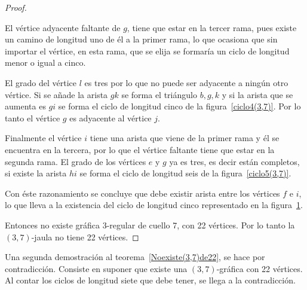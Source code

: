 \documentclass[12pt]{book}
\theoremstyle{definition}
\begin{document}
\begin{proof}
\begin{figure}
\caption{} \label{ciclo6(3,7)}
\end{figure}


El vértice adyacente faltante de $g$, tiene que estar en la tercer
rama, pues existe un camino de longitud uno de él a la primer rama, lo
que ocasiona que sin importar el vértice, en esta rama, que se elija
se formaría un ciclo de longitud menor o igual a cinco.

El grado del vértice $l$ es tres por lo que no puede ser adyacente a
ningún otro vértice. Si se añade la arista $gk$ se forma el triángulo
$b,g,k$ y si la arista que se aumenta es $gi$ se forma el ciclo de
longitud cinco de la
figura~\ref{ciclo4(3,7)}. Por lo tanto el vértice $g$ es adyacente al
vértice $j$.


Finalmente el vértice $i$ tiene una arista que viene de la primer rama
y él se encuentra en la tercera, por lo que el vértice faltante tiene
que estar en la segunda
rama. El grado de los vértices $e$ y $g$ ya es tres, es decir están
completos, si existe la arista $hi$ se forma el ciclo de
longitud seis de la figura~\ref{ciclo5(3,7)}.


Con éste razonamiento se concluye que debe existir arista entre los
vértices $f$ e $i$, lo que lleva a la existencia del ciclo de longitud cinco
representado en la figura~\ref{ciclo6(3,7)}. 

Entonces no existe gráfica $3$-regular de cuello 7, con 22
vértices. Por lo tanto la $(3,7)$-jaula no tiene 22 vértices.



\end{proof}


Una segunda demostración al teorema~\ref{Noexiste(3,7)de22},
se hace por contradicción. Consiste en suponer que existe una $(3,7)$-gráfica con 22 vértices. Al contar los ciclos de longitud siete que debe tener, se llega a la contradicción.
\end{document}
